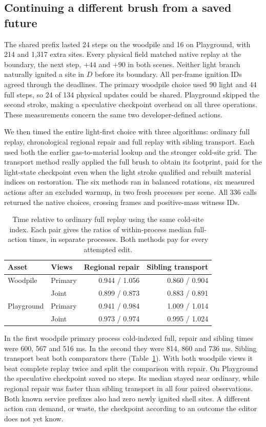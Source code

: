 \subsection{Continuing a different brush from a saved future}
The shared prefix lasted 24 steps on the woodpile and 16 on Playground, with 214 and 1,317 extra sites. Every physical field matched native replay at the boundary, the next step, $+44$ and $+90$ in both scenes. Neither light branch naturally ignited a site in $D$ before its boundary. All per-frame ignition IDs agreed through the deadlines. The primary woodpile choice used 90 light and 44 full steps, so 24 of 134 physical updates could be shared. Playground skipped the second stroke, making a speculative checkpoint overhead on all three operations. These measurements concern the same two developer-defined actions.

We then timed the entire light-first choice with three algorithms: ordinary full replay, chronological regional repair and full replay with sibling transport. Each used both the earlier gas-to-material lookup and the stronger cold-site grid. The transport method really applied the full brush to obtain its footprint, paid for the light-state checkpoint even when the light stroke qualified and rebuilt material indices on restoration. The six methods ran in balanced rotations, six measured actions after an excluded warmup, in two fresh processes per scene. All 336 calls returned the native choices, crossing frames and positive-mass witness IDs.

\begin{table}[t]
\caption{Time relative to ordinary full replay using the same cold-site index. Each pair gives the ratios of within-process median full-action times, in separate processes. Both methods pay for every attempted edit.}
\label{tab:siblings}
\centering\small
\begin{tabular}{llrr}\toprule
Asset & Views & Regional repair & Sibling transport\\\midrule
Woodpile & Primary & 0.944 / 1.056 & 0.860 / 0.904\\
 & Joint & 0.899 / 0.873 & 0.883 / 0.891\\
Playground & Primary & 0.941 / 0.984 & 1.009 / 1.014\\
 & Joint & 0.973 / 0.974 & 0.995 / 1.024\\\bottomrule
\end{tabular}
\end{table}

In the first woodpile primary process cold-indexed full, repair and sibling times were 600, 567 and 516 ms. In the second they were 814, 860 and 736 ms. Sibling transport beat both comparators there (Table~\ref{tab:siblings}). With both woodpile views it beat complete replay twice and split the comparison with repair. On Playground the speculative checkpoint saved no steps. Its median stayed near ordinary, while regional repair was faster than sibling transport in all four paired observations. Both known service prefixes also had zero newly ignited shell sites. A different action can demand, or waste, the checkpoint according to an outcome the editor does not yet know.

